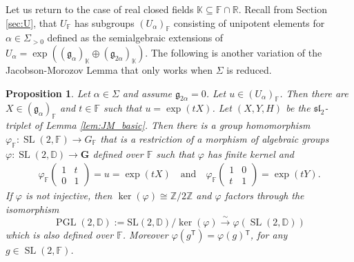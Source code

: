 \documentclass[12pt]{amsart}
\newcommand{\F}{\mathbb{F} }
\newcommand{\R}{\mathbb{R} }
\newcommand{\Z}{\mathbb{Z} }
\newcommand{\D}{\mathbb{D} }
\newcommand{\K}{\mathbb{K}}
\newcommand{\frakg}{\mathfrak{g}}
\newcommand{\bG}{\mathbf{G}}
\newcommand{\tran}{{^{\mathsf{T}}\!}}
\numberwithin{equation}{section}
\newtheorem{proposition}[theorem]{Proposition}
\theoremstyle{remark} %
\begin{document}
Let us return to the case of real closed fields $\K \subseteq \F \cap \R$. Recall from Section \ref{sec:U}, that $U_\F$ has subgroups $(U_\alpha)_\F$ consisting of unipotent elements for $\alpha \in \Sigma_{>0}$ defined as the semialgebraic extensions of $U_\alpha = \exp((\frakg_\alpha)_\K \oplus (\frakg_{2\alpha })_\K)$. The following is another variation of the Jacobson-Morozov Lemma that only works when $\Sigma$ is reduced. 
\begin{proposition}\label{prop:Jacobson_Morozov_real_closed}
	Let $\alpha \in \Sigma$ and assume $\frakg_{2\alpha} = 0$. Let $u \in (U_{\alpha})_\F$. Then there are $ X \in (\frakg_\alpha)_\F$ and $t \in \F$ such that $u=\exp(tX)$. Let $(X,Y,H)$ be the $\mathfrak{sl}_2$-triplet of Lemma \ref{lem:JM_basic}. Then there is a group homomorphism $\varphi_\F \colon \operatorname{SL}(2,\F) \to G_\F$ that is a restriction of a morphism of algebraic groups
	$
	\varphi \colon \operatorname{SL}(2,\D)  \to \bG 
	$
	defined over $\F$ such that $\varphi$ has finite kernel and
	\begin{align*}
		\varphi_\F \begin{pmatrix}
			1 & t \\ 0& 1
		\end{pmatrix} =  u = \exp(tX)  \quad \text{and} \quad  \varphi_\F \begin{pmatrix}
		1 & 0 \\ t & 1
		\end{pmatrix} = \exp(tY).
	\end{align*}
	If $\varphi$ is not injective, then $\ker (\varphi) \cong \Z/2\Z$ and $\varphi$ factors through the isomorphism
	$$
	\operatorname{PGL}(2,\D) := \operatorname{SL(2,\D)}/\ker(\varphi)  \xrightarrow{\sim} \varphi(\operatorname{SL}(2,\D))
	$$
	which is also defined over $\F$. Moreover $\varphi(g\tran) = \varphi(g)\tran$, for any $g \in \operatorname{SL}(2,\F)$.
\end{proposition}
\end{document}
